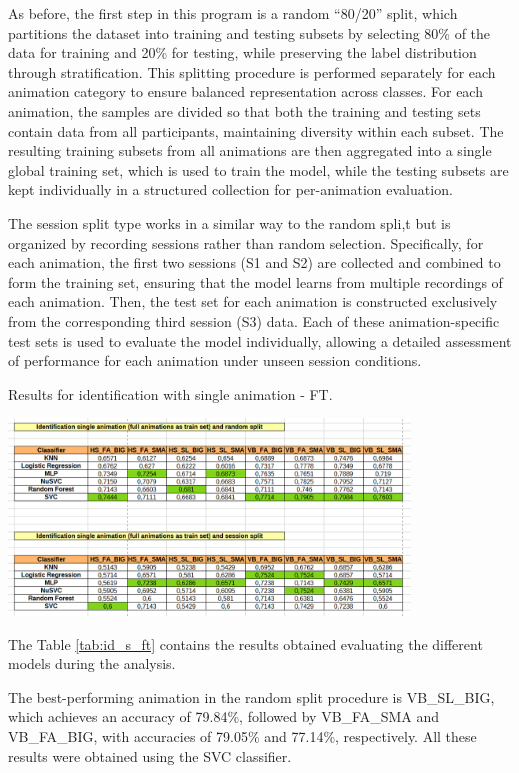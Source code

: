 \documentclass[12pt]{report}
\begin{document}
As before, the first step in this program is a random “80/20” split, which partitions the dataset into training and testing subsets by selecting 80\% of the data for training and 20\% for testing, while preserving the label distribution through stratification. 
This splitting procedure is performed separately for each animation category to ensure balanced representation across classes. 
For each animation, the samples are divided so that both the training and testing sets contain data from all participants, maintaining diversity within each subset. 
The resulting training subsets from all animations are then aggregated into a single global training set, which is used to train the model, while the testing subsets are kept individually in a structured collection for per-animation evaluation. 

The session split type works in a similar way to the random spli,t but is organized by recording sessions rather than random selection. 
Specifically, for each animation, the first two sessions (S1 and S2) are collected and combined to form the training set, ensuring that the model learns from multiple recordings of each animation. 
Then, the test set for each animation is constructed exclusively from the corresponding third session (S3) data. 
Each of these animation-specific test sets is used to evaluate the model individually, allowing a detailed assessment of performance for each animation under unseen session conditions.

\begin{table}[ht]
    \centering
    \caption{Results for identification with single animation - FT.}
    \includegraphics[width=0.8\textwidth]{Images/Results/Identification_single/single_id_ft.png}
    \label{tab:id_s_ft}
\end{table}


The Table \ref{tab:id_s_ft} contains the results obtained evaluating the different models during the analysis.

The best-performing animation in the random split procedure is VB\_SL\_BIG, which achieves an accuracy of 79.84\%, followed by VB\_FA\_SMA and VB\_FA\_BIG, with accuracies of 79.05\% and 77.14\%, respectively.
All these results were obtained using the SVC classifier.
\end{document}
